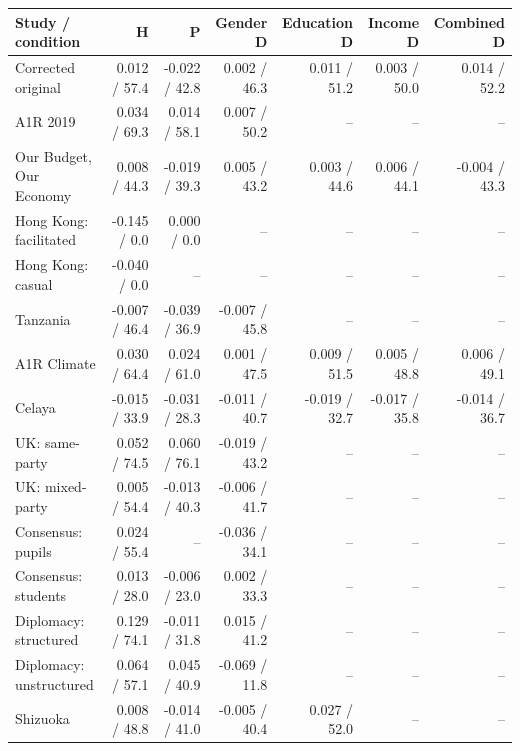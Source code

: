 
\begin{tabular}{lrrrrrr}
\toprule
Study / condition & H & P & Gender D & Education D & Income D & Combined D\\
\midrule
Corrected original & 0.012 / 57.4 & -0.022 / 42.8 & 0.002 / 46.3 & 0.011 / 51.2 & 0.003 / 50.0 & 0.014 / 52.2\\
A1R 2019 & 0.034 / 69.3 & 0.014 / 58.1 & 0.007 / 50.2 & -- & -- & --\\
Our Budget, Our Economy & 0.008 / 44.3 & -0.019 / 39.3 & 0.005 / 43.2 & 0.003 / 44.6 & 0.006 / 44.1 & -0.004 / 43.3\\
Hong Kong: facilitated & -0.145 / 0.0 & 0.000 / 0.0 & -- & -- & -- & --\\
Hong Kong: casual & -0.040 / 0.0 & -- & -- & -- & -- & --\\
\addlinespace
Tanzania & -0.007 / 46.4 & -0.039 / 36.9 & -0.007 / 45.8 & -- & -- & --\\
A1R Climate & 0.030 / 64.4 & 0.024 / 61.0 & 0.001 / 47.5 & 0.009 / 51.5 & 0.005 / 48.8 & 0.006 / 49.1\\
Celaya & -0.015 / 33.9 & -0.031 / 28.3 & -0.011 / 40.7 & -0.019 / 32.7 & -0.017 / 35.8 & -0.014 / 36.7\\
UK: same-party & 0.052 / 74.5 & 0.060 / 76.1 & -0.019 / 43.2 & -- & -- & --\\
UK: mixed-party & 0.005 / 54.4 & -0.013 / 40.3 & -0.006 / 41.7 & -- & -- & --\\
\addlinespace
Consensus: pupils & 0.024 / 55.4 & -- & -0.036 / 34.1 & -- & -- & --\\
Consensus: students & 0.013 / 28.0 & -0.006 / 23.0 & 0.002 / 33.3 & -- & -- & --\\
Diplomacy: structured & 0.129 / 74.1 & -0.011 / 31.8 & 0.015 / 41.2 & -- & -- & --\\
Diplomacy: unstructured & 0.064 / 57.1 & 0.045 / 40.9 & -0.069 / 11.8 & -- & -- & --\\
Shizuoka & 0.008 / 48.8 & -0.014 / 41.0 & -0.005 / 40.4 & 0.027 / 52.0 & -- & --\\
\bottomrule
\end{tabular}
